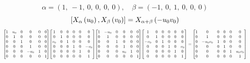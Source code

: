 \documentclass[11pt]{article}
\theoremstyle{definition}
\begin{document}
\[
\alpha = \left( 1, \  -1, \  0, \  0, \  0, \  0\right), \quad \beta = \left( -1, \  0, \  1, \  0, \  0, \  0\right)
\]
\[
\scaletoalign{\textwidth}{\left[ X_{\alpha}\left(u_{0}\right), X_{\beta}\left(v_{0}\right) \right] = X_{\alpha + \beta}\left(- u_{0} v_{0}\right)}
\]
\[
\scaletoalign{\textwidth}{{\left[\begin{matrix}1 & u_{0} & 0 & 0 & 0 & 0\\0 & 1 & 0 & 0 & 0 & 0\\0 & 0 & 1 & 0 & 0 & 0\\0 & 0 & 0 & 1 & 0 & 0\\0 & 0 & 0 & - u_{0} & 1 & 0\\0 & 0 & 0 & 0 & 0 & 1\end{matrix}\right]} {\left[\begin{matrix}1 & 0 & 0 & 0 & 0 & 0\\0 & 1 & 0 & 0 & 0 & 0\\v_{0} & 0 & 1 & 0 & 0 & 0\\0 & 0 & 0 & 1 & 0 & - v_{0}\\0 & 0 & 0 & 0 & 1 & 0\\0 & 0 & 0 & 0 & 0 & 1\end{matrix}\right]} {\left[\begin{matrix}1 & - u_{0} & 0 & 0 & 0 & 0\\0 & 1 & 0 & 0 & 0 & 0\\0 & 0 & 1 & 0 & 0 & 0\\0 & 0 & 0 & 1 & 0 & 0\\0 & 0 & 0 & u_{0} & 1 & 0\\0 & 0 & 0 & 0 & 0 & 1\end{matrix}\right]} {\left[\begin{matrix}1 & 0 & 0 & 0 & 0 & 0\\0 & 1 & 0 & 0 & 0 & 0\\- v_{0} & 0 & 1 & 0 & 0 & 0\\0 & 0 & 0 & 1 & 0 & v_{0}\\0 & 0 & 0 & 0 & 1 & 0\\0 & 0 & 0 & 0 & 0 & 1\end{matrix}\right]} = {\left[\begin{matrix}1 & 0 & 0 & 0 & 0 & 0\\0 & 1 & 0 & 0 & 0 & 0\\0 & - u_{0} v_{0} & 1 & 0 & 0 & 0\\0 & 0 & 0 & 1 & 0 & 0\\0 & 0 & 0 & 0 & 1 & u_{0} v_{0}\\0 & 0 & 0 & 0 & 0 & 1\end{matrix}\right]}}
\]
\end{document}
